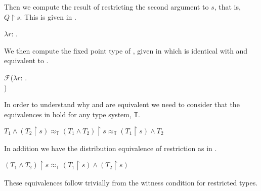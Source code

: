 Then we compute the result of restricting the second argument to $s$,
that is,  $Q\!\restriction\!s$.  This is given in \nexteg{}.
\begin{ex} 
$\lambda
               r$: . \\
\hspace*{5em}                  
   
\end{ex} 
We then compute the fixed point type of \preveg{}, given in
 which is identical with  and equivalent to .
\begin{ex} 
\begin{subex} 
 
\item $\mathcal{F}$($\lambda
               r$: . \\
\hspace*{5em}
)

\item {}
 
\item  {}
 
\end{subex} 
   
\end{ex}
\begin{shaded}
  In order to understand why  and  are equivalent
  we need to consider that the equivalences in \nexteg{} hold for any
  type system, $\mathbb{T}$.
  \begin{ex} 
$T_1\wedge(T_2\!\restriction\!s)\approx_{\mathbb{T}}(T_1\wedge
T_2)\!\restriction\!s\approx_{\mathbb{T}}(T_1\!\restriction\!s)\wedge T_2$ 
\end{ex}
In addition we have the distribution equivalence of restriction as in
\nexteg{}.
\begin{ex} 
$(T_1\wedge T_2)\!\restriction\!s\approx_{\mathbb{T}}(T_1\!\restriction\!s)\wedge(T_2\!\restriction\!s)$ 
\end{ex}
These equivalences follow trivially from the witness condition for
restricted types.
\end{shaded}  
  
